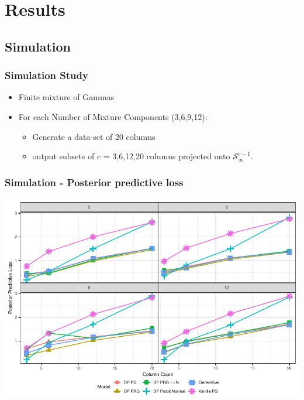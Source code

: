 \documentclass[aspectratio=169]{beamer}
\newlength{\frametextheight}
\begin{document}
\section{Results}

\subsection{Simulation}

\begin{frame}
  \frametitle{Simulation Study}
  \begin{itemize}
    \item Finite mixture of Gammas
    \item For each Number of Mixture Components (3,6,9,12):
      \begin{itemize}
        \item Generate a data-set of 20 columns
        \item output subsets of c = 3,6,12,20 columns projected onto $\mathcal{S}_{\infty}^{c-1}$.
      \end{itemize}
  \end{itemize}
\end{frame}

\begin{frame}
  \frametitle{Simulation - Posterior predictive loss}
  \begin{center}
    \includegraphics[height=\frametextheight]{./images/simulation_ppl}
  \end{center}
\end{frame}
\end{document}
